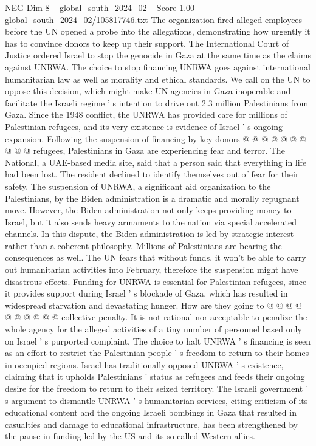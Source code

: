 \begin{textsample}{NEG Dim 8 – global\_south\_2024\_02 – Score 1.00 – global\_south\_2024\_02/105817746.txt}
The organization fired alleged employees before the UN opened a probe into the allegations, demonstrating how urgently it has to convince donors to keep up their support.
The International Court of Justice ordered Israel to stop the genocide in Gaza at the same time as the claims against UNRWA.
The choice to stop financing UNRWA goes against international humanitarian law as well as morality and ethical standards.
We call on the UN to oppose this decision, which might make UN agencies in Gaza inoperable and facilitate the Israeli regime ' s intention to drive out 2.3 million Palestinians from Gaza.
Since the 1948 conflict, the UNRWA has provided care for millions of Palestinian refugees, and its very existence is evidence of Israel ' s ongoing expansion.
Following the suspension of financing by key donors @ @ @ @ @ @ @ @ @ @ refugees, Palestinians in Gaza are experiencing fear and terror.
The National, a UAE-based media site, said that a person said that everything in life had been lost.
The resident declined to identify themselves out of fear for their safety.
The suspension of UNRWA, a significant aid organization to the Palestinians, by the Biden administration is a dramatic and morally repugnant move.
However, the Biden administration not only keeps providing money to Israel, but it also sends heavy armaments to the nation via special accelerated channels.
In this dispute, the Biden administration is led by strategic interest rather than a coherent philosophy.
Millions of Palestinians are bearing the consequences as well.
The UN fears that without funds, it won't be able to carry out humanitarian activities into February, therefore the suspension might have disastrous effects.
Funding for UNRWA is essential for Palestinian refugees, since it provides support during Israel ' s blockade of Gaza, which has resulted in widespread starvation and devastating hunger.
How are they going to @ @ @ @ @ @ @ @ @ @ collective penalty.
It is not rational nor acceptable to penalize the whole agency for the alleged activities of a tiny number of personnel based only on Israel ' s purported complaint.
The choice to halt UNRWA ' s financing is seen as an effort to restrict the Palestinian people ' s freedom to return to their homes in occupied regions.
Israel has traditionally opposed UNRWA ' s existence, claiming that it upholds Palestinians ' status as refugees and feeds their ongoing desire for the freedom to return to their seized territory.
The Israeli government ' s argument to dismantle UNRWA ' s humanitarian services, citing criticism of its educational content and the ongoing Israeli bombings in Gaza that resulted in casualties and damage to educational infrastructure, has been strengthened by the pause in funding led by the US and its so-called Western allies.

\end{textsample}
